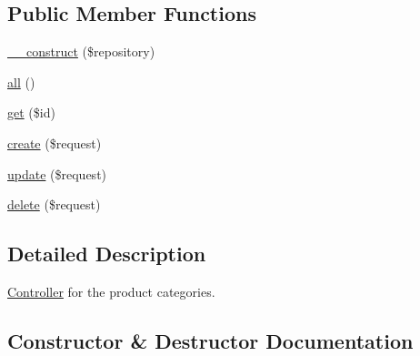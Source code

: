 \subsection*{Public Member Functions}
\begin{DoxyCompactItemize}
\item 
\mbox{\hyperlink{class_app_1_1_http_1_1_controllers_1_1_product_1_1_category_controller_a5b75ba6bc9debb999c0186a31978ec03}{\+\_\+\+\_\+construct}} (\$repository)
\item 
\mbox{\hyperlink{class_app_1_1_http_1_1_controllers_1_1_product_1_1_category_controller_af9d14e4ae6227970ad603987781573ca}{all}} ()
\item 
\mbox{\hyperlink{class_app_1_1_http_1_1_controllers_1_1_product_1_1_category_controller_a50e3bfb586b2f42932a6a93f3fbb0828}{get}} (\$id)
\item 
\mbox{\hyperlink{class_app_1_1_http_1_1_controllers_1_1_product_1_1_category_controller_a4fa811c83f27da01b0d92bdb2a711a13}{create}} (\$request)
\item 
\mbox{\hyperlink{class_app_1_1_http_1_1_controllers_1_1_product_1_1_category_controller_ab7b27a90191560dcef32126b0945db0d}{update}} (\$request)
\item 
\mbox{\hyperlink{class_app_1_1_http_1_1_controllers_1_1_product_1_1_category_controller_a126a3799c44d72393ca4732081306dfd}{delete}} (\$request)
\end{DoxyCompactItemize}


\subsection{Detailed Description}
\mbox{\hyperlink{class_app_1_1_http_1_1_controllers_1_1_controller}{Controller}} for the product categories. 

\subsection{Constructor \& Destructor Documentation}
\mbox{\label{class_app_1_1_http_1_1_controllers_1_1_product_1_1_category_controller_a5b75ba6bc9debb999c0186a31978ec03}} 
